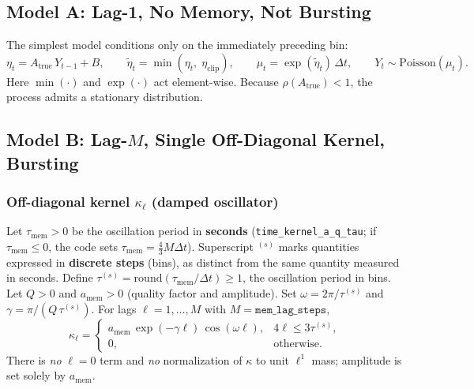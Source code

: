 \documentclass[11pt]{article}
\begin{document}
\subsection{Model A: Lag-1, No Memory, Not Bursting}
\label{sec:lag1}

The simplest model conditions only on the immediately preceding bin:
\begin{equation}
  \eta_t = A_{\text{true}}\,Y_{t-1}+B,
  \qquad
  \tilde{\eta}_t = \min(\eta_t,\;\eta_{\mathrm{clip}}),
  \qquad
  \mu_t = \exp(\tilde{\eta}_t)\,\Delta t,
  \qquad
  Y_t \sim \mathrm{Poisson}(\mu_t).
  \label{eq:lag1}
\end{equation}
Here $\min(\cdot)$ and $\exp(\cdot)$ act element-wise. 
Because $\rho(A_{\text{true}})<1$, the process admits a stationary
distribution.

\subsection{Model B: Lag-$M$, Single Off-Diagonal Kernel, Bursting}
\label{sec:lagM_single}

\subsubsection{Off-diagonal kernel $\kappa_\ell$ (damped oscillator)}

Let $\tau_{\mathrm{mem}}>0$ be the oscillation period in \textbf{seconds}
(\texttt{time\_kernel\_a\_q\_tau}; if $\tau_{\mathrm{mem}}\le 0$, the
code sets $\tau_{\mathrm{mem}}=\tfrac{4}{3}M\Delta t$).
Superscript ${}^{(s)}$ marks quantities expressed in \textbf{discrete steps}
(bins), as distinct from the same quantity measured in seconds.
Define $\tau^{(s)}=\mathrm{round}(\tau_{\mathrm{mem}}/\Delta t)\ge 1$, the oscillation period in bins.
Let $Q>0$ and $a_{\mathrm{mem}}>0$ (quality factor and amplitude).
Set $\omega=2\pi/\tau^{(s)}$ and $\gamma=\pi/(Q\,\tau^{(s)})$.
For lags $\ell=1,\dots,M$ with $M=\texttt{mem\_lag\_steps}$,
\begin{equation}
  \kappa_\ell =
  \begin{cases}
    a_{\mathrm{mem}}\,
    \exp(-\gamma \ell)\,\cos(\omega \ell),
    & 4\ell \le 3\tau^{(s)},\\[0.35em]
    0, & \text{otherwise.}
  \end{cases}
  \label{eq:kappa_offdiag_gen4}
\end{equation}
There is \emph{no} $\ell=0$ term and \emph{no} normalization of
$\kappa$ to unit $\ell^1$ mass; amplitude is set solely by
$a_{\mathrm{mem}}$.
\end{document}
